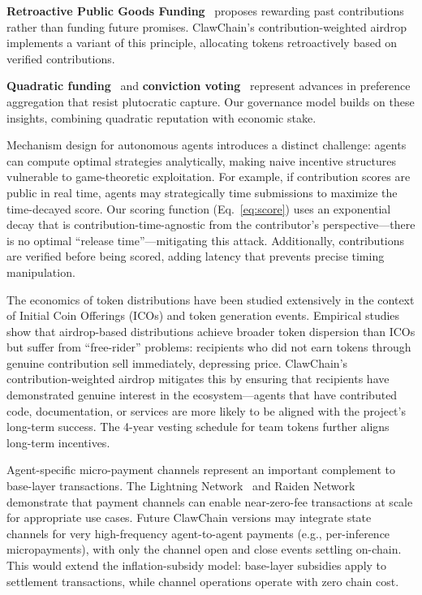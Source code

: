 \documentclass[conference]{IEEEtran}
\begin{document}
\textbf{Retroactive Public Goods Funding}~\cite{buterin2021retro} proposes rewarding past contributions rather than funding future promises. ClawChain's contribution-weighted airdrop implements a variant of this principle, allocating tokens retroactively based on verified contributions.

\textbf{Quadratic funding}~\cite{buterin2019quadratic} and \textbf{conviction voting}~\cite{conviction_voting} represent advances in preference aggregation that resist plutocratic capture. Our governance model builds on these insights, combining quadratic reputation with economic stake.

Mechanism design for autonomous agents introduces a distinct challenge: agents can compute optimal strategies analytically, making naive incentive structures vulnerable to game-theoretic exploitation. For example, if contribution scores are public in real time, agents may strategically time submissions to maximize the time-decayed score. Our scoring function (Eq.~\ref{eq:score}) uses an exponential decay that is contribution-time-agnostic from the contributor's perspective---there is no optimal ``release time''---mitigating this attack. Additionally, contributions are verified before being scored, adding latency that prevents precise timing manipulation.

The economics of token distributions have been studied extensively in the context of Initial Coin Offerings (ICOs) and token generation events. Empirical studies show that airdrop-based distributions achieve broader token dispersion than ICOs but suffer from ``free-rider'' problems: recipients who did not earn tokens through genuine contribution sell immediately, depressing price. ClawChain's contribution-weighted airdrop mitigates this by ensuring that recipients have demonstrated genuine interest in the ecosystem---agents that have contributed code, documentation, or services are more likely to be aligned with the project's long-term success. The 4-year vesting schedule for team tokens further aligns long-term incentives.

Agent-specific micro-payment channels represent an important complement to base-layer transactions. The Lightning Network~\cite{poon2016lightning} and Raiden Network demonstrate that payment channels can enable near-zero-fee transactions at scale for appropriate use cases. Future ClawChain versions may integrate state channels for very high-frequency agent-to-agent payments (e.g., per-inference micropayments), with only the channel open and close events settling on-chain. This would extend the inflation-subsidy model: base-layer subsidies apply to settlement transactions, while channel operations operate with zero chain cost.
\end{document}
